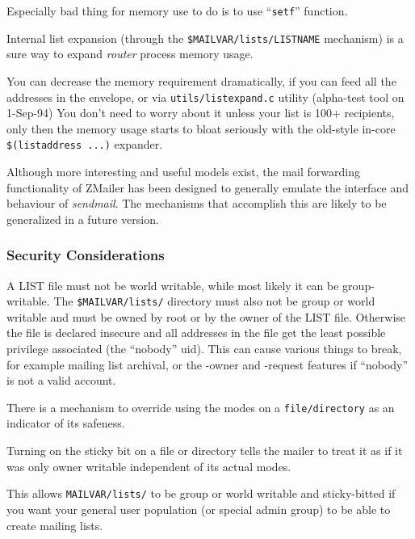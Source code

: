 Especially bad thing for memory use to do is to use ``{\tt setf}'' function.

Internal list expansion (through the  {\tt \$MAILVAR/lists/LISTNAME} 
mechanism) is a sure way to expand {\em router} process memory usage.

You can decrease the memory requirement dramatically, if you can
feed all the addresses in the envelope, or via {\tt utils/listexpand.c}
utility (alpha-test tool on 1-Sep-94) You don't need to worry about 
it unless your list is 100+ recipients, only then the memory usage starts 
to bloat seriously with the old-style in-core {\tt \$(listaddress ...)} 
expander.

Although more interesting and useful models exist, the mail forwarding
functionality of ZMailer has been designed to generally emulate the
interface and behaviour of {\em sendmail}.
The mechanisms that accomplish this are likely to be generalized in
a future version.


\subsubsection{Security Considerations}



A LIST file must not be world writable, while most likely it can be
group-writable.
The {\tt \$MAILVAR/lists/} directory must also not be group or world
writable and must be owned by root or by the owner of the LIST file.
Otherwise the file is declared insecure and all addresses in the file
get the least possible privilege associated (the ``nobody'' uid).
This can cause various things to break, for example mailing list archival,
or the -owner and -request features if ``nobody'' is not a valid account.

There is a mechanism to override using the modes on a {\tt file/directory}
as an indicator of its safeness.

Turning on the sticky bit on a file or directory tells the mailer to treat
it as if it was only owner writable independent of its actual modes.

This allows {\tt MAILVAR/lists/} to be group or world writable and
sticky-bitted if you want your general user population (or special admin
group) to be able to create mailing lists.
